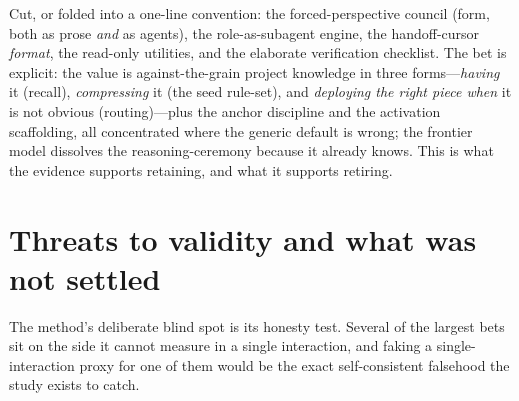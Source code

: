 \documentclass[11pt]{article}
\begin{document}
Cut, or folded into a one-line convention: the forced-perspective council (form, both as
prose \emph{and} as agents), the role-as-subagent engine, the handoff-cursor \emph{format}, the
read-only utilities, and the elaborate verification checklist. The bet is explicit: the
value is against-the-grain project knowledge in three forms---\emph{having} it (recall),
\emph{compressing} it (the seed rule-set), and \emph{deploying the right piece when} it is not
obvious (routing)---plus the anchor discipline and the activation scaffolding, all
concentrated where the generic default is wrong; the frontier model dissolves the
reasoning-ceremony because it already knows. This is what the evidence supports retaining,
and what it supports retiring.

\section{Threats to validity and what was not settled}

The method's deliberate blind spot is its honesty test. Several of the largest bets sit
on the side it cannot measure in a single interaction, and faking a single-interaction
proxy for one of them would be the exact self-consistent falsehood the study exists to
catch.
\end{document}
